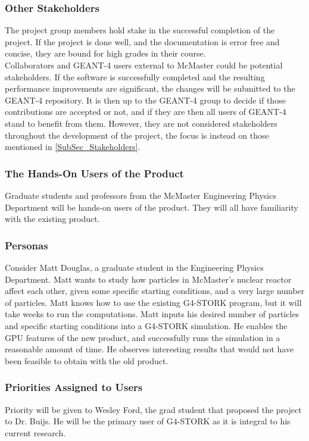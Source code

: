\documentclass[12pt]{article}
\begin{document}
\subsubsection{Other Stakeholders}
The project group members hold stake in the successful completion of the project. If the project is done well, and the documentation is error free and concise, they are bound for high grades in their course.\\

Collaborators and GEANT-4 users external to McMaster could be potential stakeholders. If the software is successfully completed and the resulting performance improvements are significant, the changes will be submitted to the GEANT-4 repository. It is then up to the GEANT-4 group to decide if those contributions are accepted or not, and if they are then all users of GEANT-4 stand to benefit from them. However, they are not considered stakeholders throughout the development of the project, the focus is instead on those mentioned in \ref{SubSec_Stakeholders}.

\subsubsection{The Hands-On Users of the Product}
Graduate students and professors from the McMaster Engineering Physics Department will be hands-on users of the product. They will all have familiarity with the existing product. 

\subsubsection{Personas}
Consider Matt Douglas, a graduate student in the Engineering Physics Department. Matt wants to study how particles in McMaster's nuclear reactor affect each other, given some specific starting conditions, and a very large number of particles. Matt knows how to use the existing G4-STORK program, but it will take weeks to run the computations. Matt inputs his desired number of particles and specific starting conditions into a G4-STORK simulation. He enables the GPU features of the new product, and successfully runs the simulation in a reasonable amount of time. He observes interesting results that would not have been feasible to obtain with the old product.\\

\subsubsection{Priorities Assigned to Users}
Priority will be given to Wesley Ford, the grad student that proposed the project to Dr. Buijs. He will be the primary user of G4-STORK as it is integral to his current research.
\end{document}
